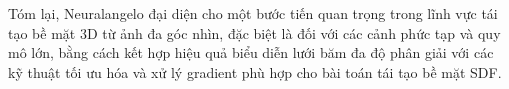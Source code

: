 Tóm lại, Neuralangelo đại diện cho một bước tiến quan trọng trong lĩnh vực tái tạo bề mặt 3D từ ảnh đa góc nhìn, đặc biệt là đối với các cảnh phức tạp và quy mô lớn, bằng cách kết hợp hiệu quả biểu diễn lưới băm đa độ phân giải với các kỹ thuật tối ưu hóa và xử lý gradient phù hợp cho bài toán tái tạo bề mặt SDF.

